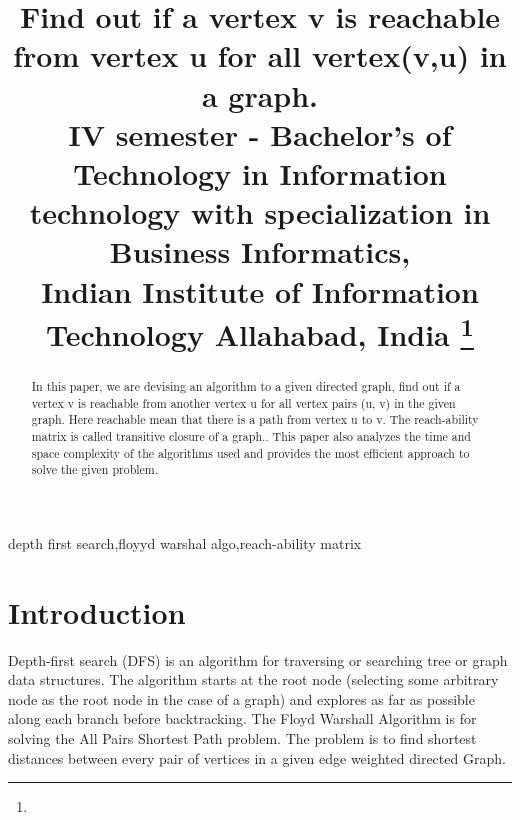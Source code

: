 \documentclass[conference]{IEEEtran}
\begin{document}
\title{Find out if a vertex v is reachable from vertex u for all vertex(v,u) in a graph.
\\
{\footnotesize {
IV semester - Bachelor’s of Technology in Information technology with specialization in Business Informatics,\\
Indian Institute of Information Technology Allahabad, India
}}
\thanks{}
}

\author{
\and
{}
\and
{}
}


\maketitle

\begin{abstract}
In this paper, we are devising an algorithm to a given directed graph, find out if a vertex v is reachable from another vertex u for all vertex pairs (u, v) in the given graph. Here reachable mean that there is a path from vertex u to v. The reach-ability matrix is called transitive closure of a graph.. This paper also analyzes the time and space complexity of the algorithms used and provides the most efficient approach to solve the given problem.
\end{abstract}
\bigskip
\begin{IEEEkeywords}
depth first search,floyyd warshal algo,reach-ability matrix
\end{IEEEkeywords}

\section{Introduction}
Depth-first search (DFS) is an algorithm for traversing or searching tree or graph data structures. The algorithm starts at the root node (selecting some arbitrary node as the root node in the case of a graph) and explores as far as possible along each branch before backtracking.
The Floyd Warshall Algorithm is for solving the All Pairs Shortest Path problem. The problem is to find shortest distances between every pair of vertices in a given edge weighted directed Graph. 
\end{document}
